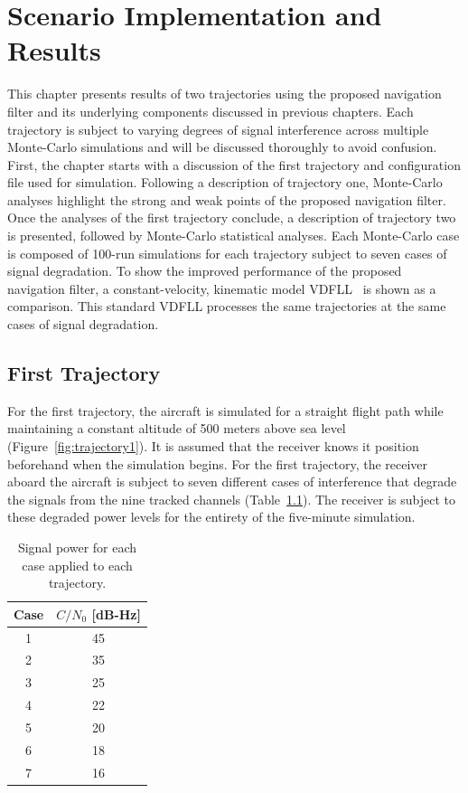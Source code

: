 \chapter{Scenario Implementation and Results}
This chapter presents results of two trajectories using the proposed navigation filter and its underlying components discussed in previous chapters. Each trajectory is subject to varying degrees of signal interference across multiple Monte-Carlo simulations and will be discussed thoroughly to avoid confusion. First, the chapter starts with a discussion of the first trajectory and configuration file used for simulation. Following a description of trajectory one, Monte-Carlo analyses highlight the strong and weak points of the proposed navigation filter. Once the analyses of the first trajectory conclude, a description of trajectory two is presented, followed by Monte-Carlo statistical analyses. Each Monte-Carlo case is composed of 100-run simulations for each trajectory subject to seven cases of signal degradation. To show the improved performance of the proposed navigation filter, a constant-velocity, kinematic model VDFLL~\cite{grierPositionNavigationTiming} is shown as a comparison. This standard VDFLL processes the same trajectories at the same cases of signal degradation.

\section{\textbf{First Trajectory}}
For the first trajectory, the aircraft is simulated for a straight flight path while maintaining a constant altitude of 500 meters above sea level (Figure~\ref{fig:trajectory1}). It is assumed that the receiver knows it position beforehand when the simulation begins. For the first trajectory, the receiver aboard the aircraft is subject to seven different cases of interference that degrade the signals from the nine tracked channels (Table~\ref{tbl:interferenceCases}). The receiver is subject to these degraded power levels for the entirety of the five-minute simulation.

\begin{table}[!ht]
    \caption{Signal power for each case applied to each trajectory.}\label{tbl:interferenceCases}
    \centering
    \begin{tabular}{cc}
        \toprule
        Case & \(C/N_0\) [dB-Hz] \\
        \midrule
        1    & 45                \\
        2    & 35                \\
        3    & 25                \\
        4    & 22                \\
        5    & 20                \\
        6    & 18                \\
        7    & 16                \\
        \bottomrule
    \end{tabular}
\end{table}

